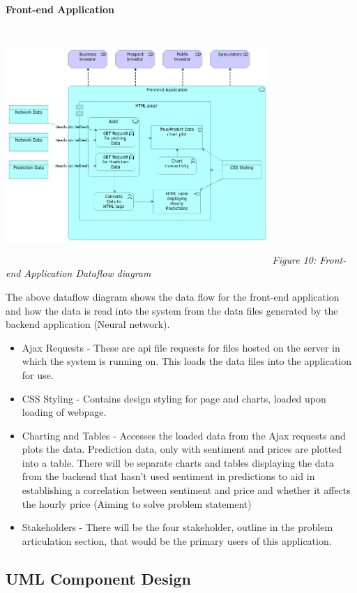 \documentclass[oneside, 10pt]{article}
\begin{document}
		\newpage
		\textbf{Front-end Application}
		\begin{center}
			\includegraphics[width=10cm,height=9cm]{images/Frontend_Application.png}
			\newline
			\textit{Figure 10: Front-end Application Dataflow diagram}
		\end{center}
		The above dataflow diagram shows the data flow for the front-end application and how the data is read into the system from the data files generated by the backend application (Neural network).
		\begin{itemize}
			\item Ajax Requests - These are api file requests for files hosted on the server in which the system is running on. This loads the data files into the application for use.
			\item CSS Styling - Contains design styling for page and charts, loaded upon loading of webpage.
			\item Charting and Tables - Accesses the loaded data from the Ajax requests and plots the data. Prediction data, only with sentiment and prices are plotted into a table. There will be separate charts and tables displaying the data from the backend that hasn't used sentiment in predictions to aid in establishing a correlation between sentiment and price and whether it affects the hourly price (Aiming to solve problem statement)
			\item Stakeholders - There will be the four stakeholder, outline in the problem articulation section, that would be the primary users of this application.
		\end{itemize}
		\newpage
		\subsection{UML Component Design}
		
\end{document}
